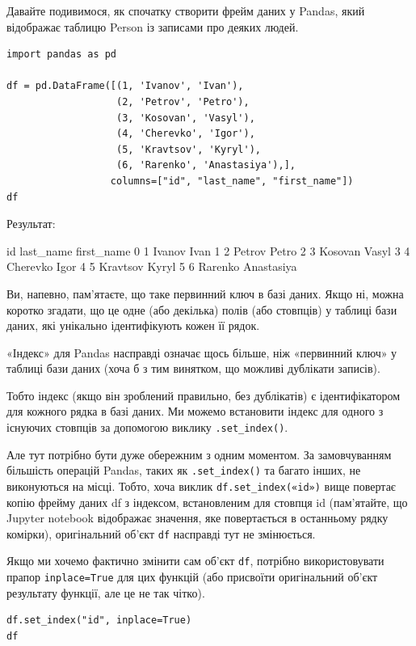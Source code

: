Давайте подивимося, як спочатку створити фрейм даних у Pandas, який відображає таблицю Person 
із записами про деяких людей.

\begin{lstlisting}
import pandas as pd

df = pd.DataFrame([(1, 'Ivanov', 'Ivan'), 
                   (2, 'Petrov', 'Petro'),
                   (3, 'Kosovan', 'Vasyl'), 
                   (4, 'Cherevko', 'Igor'),
                   (5, 'Kravtsov', 'Kyryl'),
                   (6, 'Rarenko', 'Anastasiya'),], 
                  columns=["id", "last_name", "first_name"])
df
\end{lstlisting}

Результат:

\begin{console}
    id	last_name	first_name
0	1	Ivanov	Ivan
1	2	Petrov	Petro
2	3	Kosovan	Vasyl
3	4	Cherevko	Igor
4	5	Kravtsov	Kyryl
5	6	Rarenko	Anastasiya
\end{console}

Ви, напевно, пам'ятаєте, що таке первинний ключ в базі даних. Якщо ні, можна коротко згадати, що 
це одне (або декілька) полів (або стовпців) у таблиці бази даних, які унікально ідентифікують 
кожен її рядок.

«Індекс» для Pandas насправді означає щось більше, ніж «первинний ключ» у таблиці бази 
даних (хоча б з тим винятком, що можливі дублікати записів). 

Тобто індекс (якщо він зроблений правильно, без дублікатів) є ідентифікатором для кожного 
рядка в базі даних. Ми можемо встановити індекс для одного з існуючих стовпців за допомогою 
виклику \verb|.set_index()|.

Але тут потрібно бути дуже обережним з одним моментом. За замовчуванням більшість операцій 
Pandas, таких як \verb|.set_index()| та багато інших, не виконуються на місці. Тобто, хоча 
виклик \verb|df.set_index(«id»)| вище повертає копію фрейму даних df з індексом, встановленим 
для стовпця id (пам'ятайте, що Jupyter notebook відображає значення, яке повертається 
в останньому рядку комірки), оригінальний об'єкт \verb|df| насправді тут не змінюється.

Якщо ми хочемо фактично змінити сам об'єкт \verb|df|, потрібно використовувати прапор 
\verb|inplace=True| для цих функцій (або присвоїти оригінальний об'єкт результату функції, 
але це не так чітко).

\begin{lstlisting}
df.set_index("id", inplace=True)
df
\end{lstlisting}

